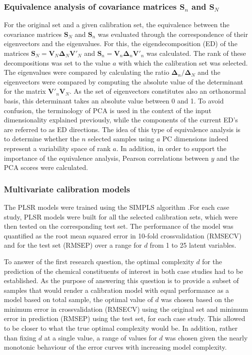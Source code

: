 \documentclass[journal=ancham,manuscript=article]{achemso}
\begin{document}
\subsubsection{Equivalence analysis of covariance matrices $\mathbf{S}_n$ and $\mathbf{S}_N$}

For the original set and a given calibration set, the equivalence between the covariance matrices $\mathbf{S}_N$ and $\mathbf{S}_n$ was evaluated through the correspondence of their eigenvectors and the eigenvalues. For this, the eigendecomposition (ED) of the matrices $\mathbf{S}_N = \mathbf{V}_N \mathbf{\Delta}_N \mathbf{V}'_N$ and $\mathbf{S}_n = \mathbf{V}_n \mathbf{\Delta}_n \mathbf{V}'_n$ was calculated. The rank of these decompositions was set to the value $a$ with which the calibration set was selected. The eigenvalues were compared by calculating the ratio  $\mathbf{\Delta}_n/\mathbf{\Delta}_N$ and the eigenvectors were compared by computing the absolute value of the determinant for the matrix $\mathbf{V}'_n\mathbf{V}_N$. As the set of eigenvectors constitutes also an orthonormal basis, this determinant takes an absolute value between 0 and 1. To avoid confusion, the terminology of PCA is used in the context of the input dimensionality explained previously, while the components of the current ED's are referred to as ED directions. The idea of this type of equivalence analysis is to determine whether the $n$ selected samples using $a$ PC dimensions indeed represent a variability space of rank $a$. In addition, in order to support the importance of the equivalence analysis, Pearson correlations between $y$ and the PCA scores were calculated.

\subsubsection{Multivariate calibration models}

The PLSR models were trained using the SIMPLS algorithm \cite{DeJong1993}.For each case study, PLSR models were built for all the selected calibration sets, which were then tested on the corresponding test set. The performance of the model was quantified as the root mean squared error in 10-fold crossvalidation (RMSECV) and for the test set (RMSEP) over a range for $d$ from 1 to 25 latent variables. 

To answer of the first research question, the optimal complexity $d$ for the prediction of the chemical constituents of interest in both case studies had
to be established. As the purpose of answering this question is to provide a subset of samples that would render a calibration model with equal performance as a model based on total sample, the optimal value of $d$ was chosen based on the minimum error in crossvalidation (RMSECV) using the original set and minimum error in prediction (RMSEP) using the test set, for each case study. This allowed to be closer to what the true optimal complexity would be. In addition, rather than fixing $d$ at a single value, a range of values for $d$ was chosen given the nearly monotonic behaviour of the error curves with increasing model complexity. 
\end{document}
